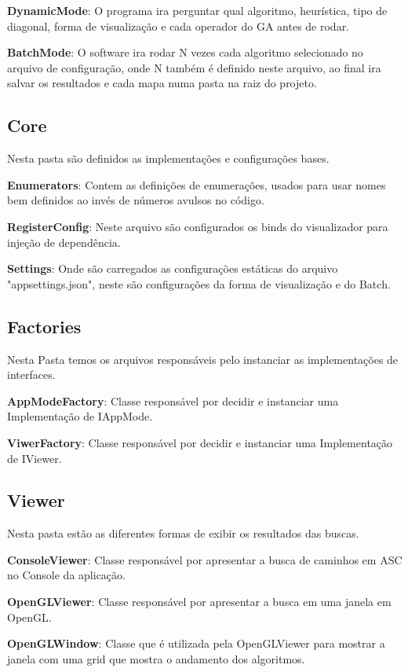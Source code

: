\textbf{DynamicMode}: O programa ira perguntar qual algoritmo, heurística, tipo de diagonal, forma de visualização e cada operador do GA antes de rodar.

\textbf{BatchMode}: O software ira rodar N vezes cada algoritmo selecionado no arquivo de configuração, onde N também é definido neste arquivo, ao final ira salvar os resultados e cada mapa numa pasta na raiz do projeto.


\subsection{Core}

Nesta pasta são definidos as implementações e configurações bases.

\textbf{Enumerators}: Contem as definições de enumerações, usados para usar nomes bem definidos ao invés de números avulsos no código.

\textbf{RegisterConfig}: Neste arquivo são configurados os binds do visualizador para injeção de dependência.

\textbf{Settings}: Onde são carregados as configurações estáticas do arquivo "appsettings.json", neste são configurações da forma de visualização e do Batch.

\subsection{Factories}

Nesta Pasta temos os arquivos responsáveis pelo instanciar as implementações de interfaces.

\textbf{AppModeFactory}: Classe responsável por decidir e instanciar uma Implementação de IAppMode.

\textbf{ViwerFactory}: Classe responsável por decidir e instanciar uma Implementação de IViewer.

\subsection{Viewer}

Nesta pasta estão as diferentes formas de exibir os resultados das buscas.

\textbf{ConsoleViewer}: Classe responsável por apresentar a busca de caminhos em ASC no Console da aplicação.

\textbf{OpenGLViewer}: Classe responsável por apresentar a busca em uma janela em OpenGL.

\textbf{OpenGLWindow}: Classe que é utilizada pela OpenGLViewer para mostrar a janela com uma grid que mostra o andamento dos algoritmos.


